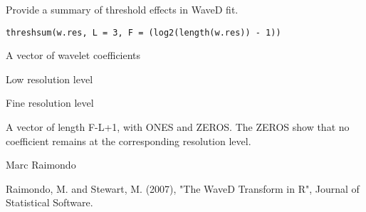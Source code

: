 \begin{Description}\relax
Provide a summary of threshold effects in WaveD fit.
\end{Description}
\begin{Usage}
\begin{verbatim}
threshsum(w.res, L = 3, F = (log2(length(w.res)) - 1))
\end{verbatim}
\end{Usage}
\begin{Arguments}
\begin{ldescription}
\item[\code{w.res}] A vector of wavelet coefficients 
\item[\code{L}] Low resolution level 
\item[\code{F}] Fine resolution level
\end{ldescription}
\end{Arguments}
\begin{Value}
A vector of length F-L+1, 
with ONES and ZEROS. The ZEROS show that
no coefficient remains at the corresponding resolution level.
\end{Value}
\begin{Author}\relax
Marc Raimondo
\end{Author}
\begin{References}\relax
Raimondo, M. and Stewart, M. (2007),
"The WaveD Transform in R", Journal of Statistical Software.
\end{References}
\begin{SeeAlso}\relax
{}
\end{SeeAlso}
\begin{Examples}
\end{Examples}

